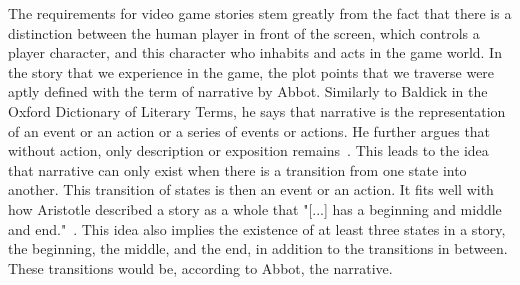 The requirements for video game stories stem greatly from the fact that there is a distinction between the human player in front of the screen, which controls a player character, and this character who inhabits and acts in the game world. In the story that we experience in the game, the plot points that we traverse were aptly defined with the term of narrative by Abbot. Similarly to Baldick in the Oxford Dictionary of Literary Terms, he says that narrative is the representation of an event or an action or a series of events or actions. He further argues that without action, only description or exposition remains~\cite{Abbott2020}. This leads to the idea that narrative can only exist when there is a transition from one state into another. This transition of states is then an event or an action. It fits well with how Aristotle described a story as a whole that "[...] has a beginning and middle and end."~\cite{Aristotle2006}. This idea also implies the existence of at least three states in a story, the beginning, the middle, and the end, in addition to the transitions in between. These transitions would be, according to Abbot, the narrative.
